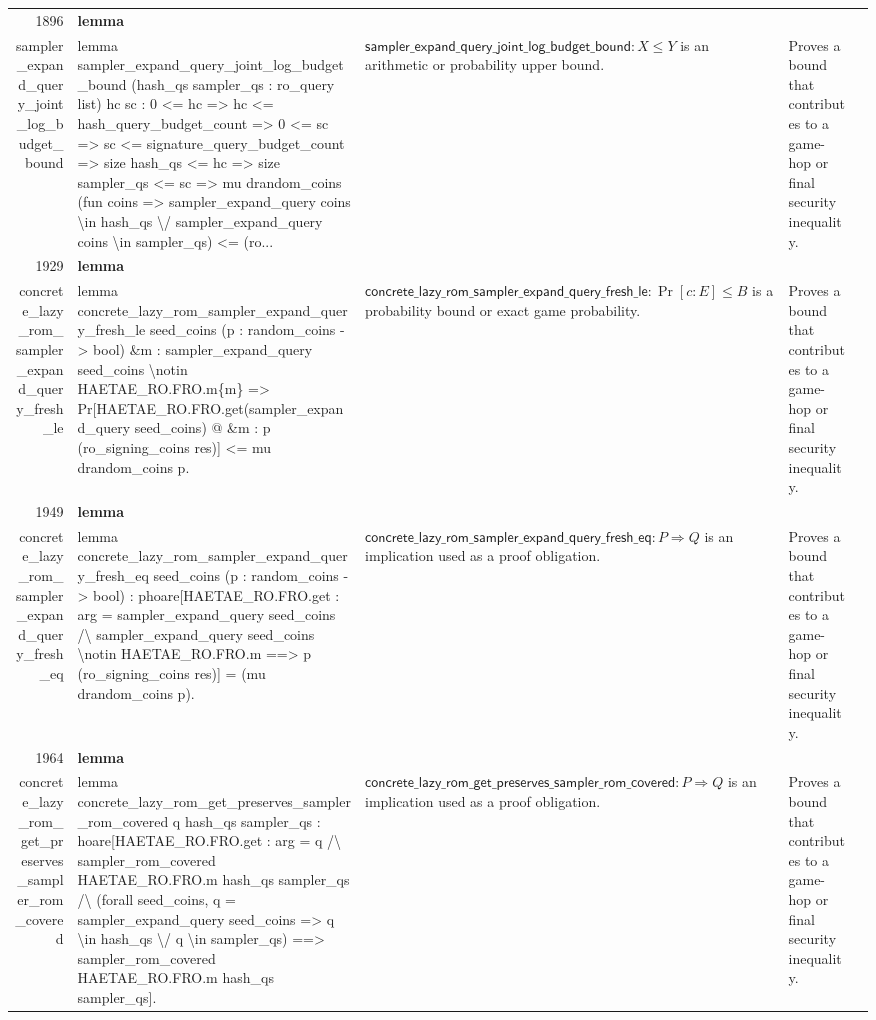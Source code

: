 \documentclass[10pt]{article}
\newcommand{\ec}[1]{\begingroup\ttfamily\scriptsize #1\endgroup}
\begin{document}
\begin{longtable}{r L{0.17\textwidth} L{0.26\textwidth} L{0.27\textwidth} L{0.20\textwidth}}
1896 & \textbf{lemma}\\\ec{sampler\_expand\_query\_joint\_log\_budget\_bound} & \ec{lemma sampler\_expand\_query\_joint\_log\_budget\_bound (hash\_qs sampler\_qs : ro\_query list) hc sc : 0 <= hc => hc <= hash\_query\_budget\_count => 0 <= sc => sc <= signature\_query\_budget\_count => size hash\_qs <= hc => size sampler\_qs <= sc => mu drandom\_coins (fun coins => sampler\_expand\_query coins \textbackslash{}in hash\_qs \textbackslash{}/ sampler\_expand\_query coins \textbackslash{}in sampler\_qs) <= (ro...} & \(\mathsf{sampler\_expand\_query\_joint\_log\_budget\_bound} : X \le Y\) is an arithmetic or probability upper bound. & Proves a bound that contributes to a game-hop or final security inequality. \\
1929 & \textbf{lemma}\\\ec{concrete\_lazy\_rom\_sampler\_expand\_query\_fresh\_le} & \ec{lemma concrete\_lazy\_rom\_sampler\_expand\_query\_fresh\_le seed\_coins (p : random\_coins -> bool) \&m : sampler\_expand\_query seed\_coins \textbackslash{}notin HAETAE\_RO.FRO.m\{m\} => Pr[HAETAE\_RO.FRO.get(sampler\_expand\_query seed\_coins) @ \&m : p (ro\_signing\_coins res)] <= mu drandom\_coins p.} & \(\mathsf{concrete\_lazy\_rom\_sampler\_expand\_query\_fresh\_le} : \Pr[c : E] \le B\) is a probability bound or exact game probability. & Proves a bound that contributes to a game-hop or final security inequality. \\
1949 & \textbf{lemma}\\\ec{concrete\_lazy\_rom\_sampler\_expand\_query\_fresh\_eq} & \ec{lemma concrete\_lazy\_rom\_sampler\_expand\_query\_fresh\_eq seed\_coins (p : random\_coins -> bool) : phoare[HAETAE\_RO.FRO.get : arg = sampler\_expand\_query seed\_coins /\textbackslash{} sampler\_expand\_query seed\_coins \textbackslash{}notin HAETAE\_RO.FRO.m ==> p (ro\_signing\_coins res)] = (mu drandom\_coins p).} & \(\mathsf{concrete\_lazy\_rom\_sampler\_expand\_query\_fresh\_eq} : P \Rightarrow Q\) is an implication used as a proof obligation. & Proves a bound that contributes to a game-hop or final security inequality. \\
1964 & \textbf{lemma}\\\ec{concrete\_lazy\_rom\_get\_preserves\_sampler\_rom\_covered} & \ec{lemma concrete\_lazy\_rom\_get\_preserves\_sampler\_rom\_covered q hash\_qs sampler\_qs : hoare[HAETAE\_RO.FRO.get : arg = q /\textbackslash{} sampler\_rom\_covered HAETAE\_RO.FRO.m hash\_qs sampler\_qs /\textbackslash{} (forall seed\_coins, q = sampler\_expand\_query seed\_coins => q \textbackslash{}in hash\_qs \textbackslash{}/ q \textbackslash{}in sampler\_qs) ==> sampler\_rom\_covered HAETAE\_RO.FRO.m hash\_qs sampler\_qs].} & \(\mathsf{concrete\_lazy\_rom\_get\_preserves\_sampler\_rom\_covered} : P \Rightarrow Q\) is an implication used as a proof obligation. & Proves a bound that contributes to a game-hop or final security inequality. \\

\end{longtable}
\end{document}
